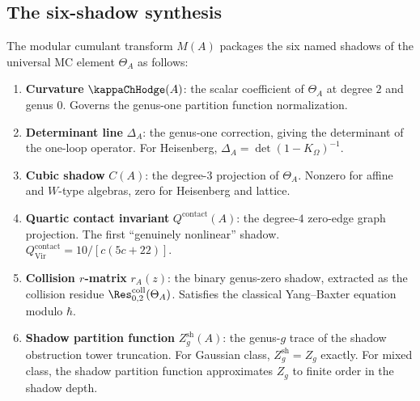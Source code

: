 \subsection{The six-shadow synthesis}

\begin{construction}
The modular cumulant transform $M(A)$ packages the six named shadows
of the universal MC element $\Theta_A$ as follows:
\begin{enumerate}[leftmargin=2.4em]
\item \textbf{Curvature} $\kappaChHodge(A)$: the scalar coefficient of $\Theta_A$
at degree $2$ and genus $0$. Governs the genus-one partition function
normalization.

\item \textbf{Determinant line} $\Delta_A$: the genus-one correction,
giving the determinant of the one-loop operator. For Heisenberg,
$\Delta_A = \det(1 - K_\Omega)^{-1}$.

\item \textbf{Cubic shadow} $C(A)$: the degree-$3$ projection of $\Theta_A$.
Nonzero for affine and $W$-type algebras, zero for Heisenberg and lattice.

\item \textbf{Quartic contact invariant} $Q^{\mathrm{contact}}(A)$: the
degree-$4$ zero-edge graph projection. The first ``genuinely nonlinear''
shadow. $Q^{\mathrm{contact}}_{\mathrm{Vir}} = 10/[c(5c+22)]$.

\item \textbf{Collision $r$-matrix} $r_A(z)$: the binary genus-zero shadow,
extracted as the collision residue $\Res^{\mathrm{coll}}_{0,2}(\Theta_A)$.
Satisfies the classical Yang--Baxter equation modulo $\hbar$.

\item \textbf{Shadow partition function} $Z^{\mathrm{sh}}_g(A)$: the
genus-$g$ trace of the shadow obstruction tower truncation. For
Gaussian class, $Z^{\mathrm{sh}}_g = Z_g$ exactly. For
mixed class, the shadow partition function approximates $Z_g$ to
finite order in the shadow depth.
\end{enumerate}
\end{construction}

